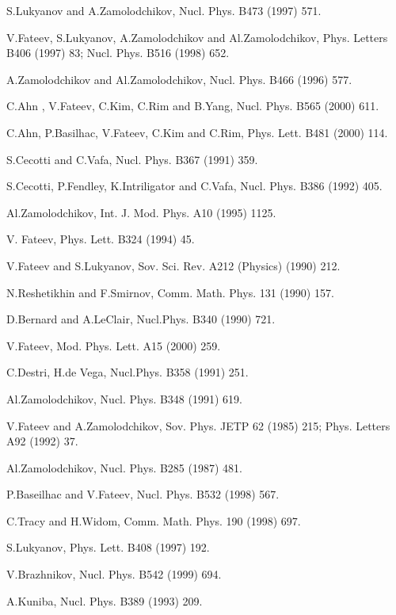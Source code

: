 \documentclass[a4paper,12pt]{article}
\begin{document}
\begin{thebibliography}{99}

  S.Lukyanov and A.Zamolodchikov, Nucl. Phys. B473 (1997) 571.

  V.Fateev, S.Lukyanov, A.Zamolodchikov and Al.Zamolodchikov,
Phys. Letters B406 (1997) 83; Nucl. Phys. B516 (1998) 652.

  A.Zamolodchikov and Al.Zamolodchikov, Nucl. Phys. B466 
(1996) 577.

  C.Ahn , V.Fateev, C.Kim, C.Rim and B.Yang,  Nucl.
Phys. B565 (2000) 611.

  C.Ahn, P.Basilhac, V.Fateev, C.Kim and C.Rim, 
Phys. Lett. B481 (2000) 114.

  S.Cecotti and C.Vafa, Nucl. Phys. B367 (1991) 359.

S.Cecotti, P.Fendley, K.Intriligator and C.Vafa, Nucl. Phys. B386 (1992)
405.

  Al.Zamolodchikov, Int. J. Mod. Phys. A10 (1995) 1125.

  V. Fateev, Phys. Lett. B324 (1994) 45.

  V.Fateev and S.Lukyanov, Sov. Sci. Rev. A212 (Physics) (1990)
212.

  N.Reshetikhin and F.Smirnov, Comm. Math. Phys. 131 (1990) 157.

  D.Bernard and A.LeClair, Nucl.Phys. B340 (1990) 721.

 V.Fateev, Mod. Phys. Lett. A15 (2000) 259.

 C.Destri, H.de Vega, Nucl.Phys. B358 (1991) 251.

  Al.Zamolodchikov, Nucl. Phys. B348 (1991) 619.

 V.Fateev and A.Zamolodchikov, Sov. Phys. JETP 62 (1985) 215;
Phys. Letters A92 (1992) 37.

   Al.Zamolodchikov, Nucl. Phys. B285 (1987) 481.

  P.Baseilhac and V.Fateev, Nucl. Phys. B532 (1998) 567.

  C.Tracy and H.Widom, Comm. Math. Phys. 190 (1998) 697.

  S.Lukyanov, Phys. Lett. B408 (1997) 192.

V.Brazhnikov, Nucl. Phys. B542 (1999) 694.

  A.Kuniba, Nucl. Phys. B389 (1993) 209.


\end{thebibliography}
\end{document}
